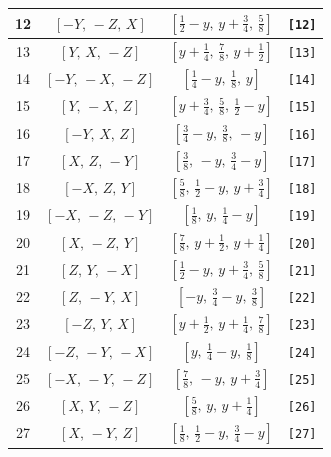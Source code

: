 \documentclass[fleqn,8pt]{jsarticle}
\begin{document}
\begin{longtable}{cccc}
12 & $\left[ - Y,\, - Z,\, X \right]$ & $\left[ \frac{1}{2} - y,\, y + \frac{3}{4},\, \frac{5}{8} \right]$ & {\tt [12]} \\ \hline
13 & $\left[ Y,\, X,\, - Z \right]$ & $\left[ y + \frac{1}{4},\, \frac{7}{8},\, y + \frac{1}{2} \right]$ & {\tt [13]} \\ \hline
14 & $\left[ - Y,\, - X,\, - Z \right]$ & $\left[ \frac{1}{4} - y,\, \frac{1}{8},\, y \right]$ & {\tt [14]} \\ \hline
15 & $\left[ Y,\, - X,\, Z \right]$ & $\left[ y + \frac{3}{4},\, \frac{5}{8},\, \frac{1}{2} - y \right]$ & {\tt [15]} \\ \hline
16 & $\left[ - Y,\, X,\, Z \right]$ & $\left[ \frac{3}{4} - y,\, \frac{3}{8},\, - y \right]$ & {\tt [16]} \\ \hline
17 & $\left[ X,\, Z,\, - Y \right]$ & $\left[ \frac{3}{8},\, - y,\, \frac{3}{4} - y \right]$ & {\tt [17]} \\ \hline
18 & $\left[ - X,\, Z,\, Y \right]$ & $\left[ \frac{5}{8},\, \frac{1}{2} - y,\, y + \frac{3}{4} \right]$ & {\tt [18]} \\ \hline
19 & $\left[ - X,\, - Z,\, - Y \right]$ & $\left[ \frac{1}{8},\, y,\, \frac{1}{4} - y \right]$ & {\tt [19]} \\ \hline
20 & $\left[ X,\, - Z,\, Y \right]$ & $\left[ \frac{7}{8},\, y + \frac{1}{2},\, y + \frac{1}{4} \right]$ & {\tt [20]} \\ \hline
21 & $\left[ Z,\, Y,\, - X \right]$ & $\left[ \frac{1}{2} - y,\, y + \frac{3}{4},\, \frac{5}{8} \right]$ & {\tt [21]} \\ \hline
22 & $\left[ Z,\, - Y,\, X \right]$ & $\left[ - y,\, \frac{3}{4} - y,\, \frac{3}{8} \right]$ & {\tt [22]} \\ \hline
23 & $\left[ - Z,\, Y,\, X \right]$ & $\left[ y + \frac{1}{2},\, y + \frac{1}{4},\, \frac{7}{8} \right]$ & {\tt [23]} \\ \hline
24 & $\left[ - Z,\, - Y,\, - X \right]$ & $\left[ y,\, \frac{1}{4} - y,\, \frac{1}{8} \right]$ & {\tt [24]} \\ \hline
25 & $\left[ - X,\, - Y,\, - Z \right]$ & $\left[ \frac{7}{8},\, - y,\, y + \frac{3}{4} \right]$ & {\tt [25]} \\ \hline
26 & $\left[ X,\, Y,\, - Z \right]$ & $\left[ \frac{5}{8},\, y,\, y + \frac{1}{4} \right]$ & {\tt [26]} \\ \hline
27 & $\left[ X,\, - Y,\, Z \right]$ & $\left[ \frac{1}{8},\, \frac{1}{2} - y,\, \frac{3}{4} - y \right]$ & {\tt [27]} \\ \hline

\end{longtable}
\end{document}
